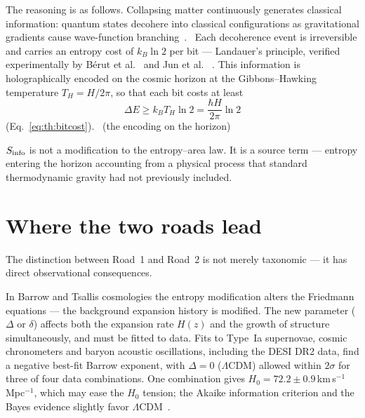 The reasoning is as follows. Collapsing matter continuously generates classical information: quantum states decohere into classical configurations as
gravitational gradients cause wave-function branching~\cite{Zurek2003}. \interp\ Each decoherence event is irreversible and carries an entropy cost of
$k_B\ln2$ per bit --- Landauer's principle, verified experimentally by B\'erut et al.~\cite{Berut2012} and Jun et al.~\cite{Jun2014} \observed. This
information is holographically encoded on the cosmic horizon at the Gibbons--Hawking temperature $T_H=H/2\pi$, so that each bit costs at least
\begin{equation}\Delta E\ge k_BT_H\ln2=\frac{\hbar H}{2\pi}\ln2\label{eq:eg_bitcost}\end{equation}
(Eq.~\eqref{eq:th:bitcost}). \conjecture\ (the encoding on the horizon)

$S_{\rm info}$ is not a modification to the entropy--area law. It is a source term --- entropy entering the horizon accounting from a physical process
that standard thermodynamic gravity had not previously included.

\section{Where the two roads lead}\label{sec:eg_lead}
The distinction between Road~1 and Road~2 is not merely taxonomic --- it has direct observational consequences.

In Barrow and Tsallis cosmologies the entropy modification alters the Friedmann equations --- the background expansion history is modified. The new
parameter ($\Delta$ or $\delta$) affects both the expansion rate $H(z)$ and the growth of structure simultaneously, and must be fitted to data. Fits to
Type~Ia supernovae, cosmic chronometers and baryon acoustic oscillations, including the DESI DR2 data, find a negative best-fit Barrow exponent, with
$\Delta=0$ ($\Lambda$CDM) allowed within $2\sigma$ for three of four data combinations. One combination gives $H_0=72.2\pm0.9$\,km\,s$^{-1}$Mpc$^{-1}$,
which may ease the $H_0$ tension; the Akaike information criterion and the Bayes evidence slightly favor $\Lambda$CDM~\cite{Luciano2025}. \observed


